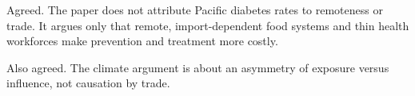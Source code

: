 \begin{counterpoint}
Agreed. The paper does not attribute Pacific diabetes rates to remoteness or
trade. It argues only that remote, import-dependent food systems and thin
health workforces make prevention and treatment more costly.
\end{counterpoint}

\begin{counterpoint}
Also agreed. The climate argument is about an asymmetry of exposure versus
influence, not causation by trade.
\end{counterpoint}
